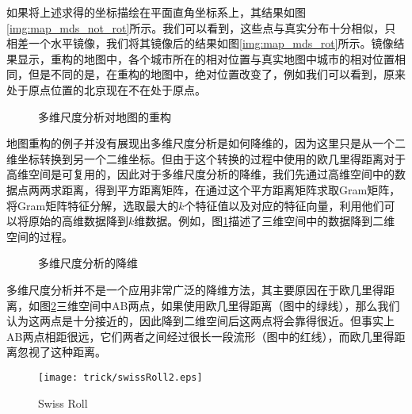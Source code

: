 如果将上述求得的坐标描绘在平面直角坐标系上，其结果如图\ref{img:map_mds_not_rot}所示。我们可以看到，这些点与真实分布十分相似，只相差一个水平镜像，我们将其镜像后的结果如图\ref{img:map_mds_rot}所示。镜像结果显示，重构的地图中，各个城市所在的相对位置与真实地图中城市的相对位置相同，但是不同的是，在重构的地图中，绝对位置改变了，例如我们可以看到，原来处于原点位置的北京现在不在处于原点。

\begin{figure}[htbp]
\centering
\subfigure{\label{img:map_mds_not_rot}}\addtocounter{subfigure}{-2}
\subfigure{\label{img:map_mds_rot}}\addtocounter{subfigure}{-2}
\caption{多维尺度分析对地图的重构}
\vspace{-1em}
\end{figure}

地图重构的例子并没有展现出多维尺度分析是如何降维的，因为这里只是从一个二维坐标转换到另一个二维坐标。但由于这个转换的过程中使用的欧几里得距离对于高维空间是可复用的，因此对于多维尺度分析的降维，我们先通过高维空间中的数据点两两求距离，得到平方距离矩阵，在通过这个平方距离矩阵求取Gram矩阵，将Gram矩阵特征分解，选取最大的$k$个特征值以及对应的特征向量，利用他们可以将原始的高维数据降到$k$维数据。例如，图\ref{img:MDS dim redu}描述了三维空间中的数据降到二维空间的过程。

\begin{figure}[htbp]
\centering
\subfigure{}\addtocounter{subfigure}{-2}
\subfigure{}\addtocounter{subfigure}{-2}
\caption{多维尺度分析的降维}
\label{img:MDS dim redu}
\vspace{-1em}
\end{figure}

多维尺度分析并不是一个应用非常广泛的降维方法，其主要原因在于欧几里得距离，如图\ref{img:swiss roll 2}三维空间中AB两点，如果使用欧几里得距离（图中的绿线），那么我们认为这两点是十分接近的，因此降到二维空间后这两点将会靠得很近。但事实上AB两点相距很远，它们两者之间经过很长一段流形（图中的红线），而欧几里得距离忽视了这种距离。

\begin{figure}[!htbp]
\centering
\texttt{[image: trick/swissRoll2.eps]}
\caption{Swiss Roll}
\label{img:swiss roll 2}
\end{figure}

